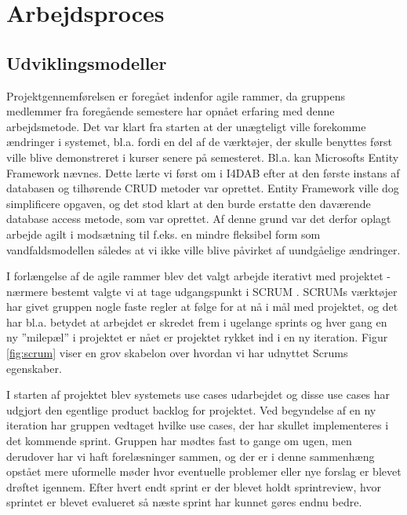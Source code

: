\section{Arbejdsproces}

\subsection{Udviklingsmodeller}
Projektgennemførelsen er foregået indenfor agile rammer, da gruppens medlemmer fra foregående semestere har opnået erfaring med denne arbejdsmetode. Det var klart fra starten at der unægteligt ville forekomme ændringer i systemet, bl.a. fordi en del af de værktøjer, der skulle benyttes først ville blive demonstreret i kurser senere på semesteret. Bl.a. kan Microsofts Entity Framework \citep{entityFrameworkWeb} nævnes. Dette lærte vi først om i I4DAB efter at den første instans af databasen og tilhørende CRUD metoder var oprettet. Entity Framework ville dog simplificere opgaven, og det stod klart at den burde erstatte den daværende database access metode, som var oprettet. Af denne grund var det derfor oplagt arbejde agilt i modsætning til f.eks. en mindre fleksibel form som vandfaldsmodellen således at vi ikke ville blive påvirket af uundgåelige ændringer.

I forlængelse af de agile rammer blev det valgt arbejde iterativt med projektet - nærmere bestemt valgte vi at tage udgangspunkt i SCRUM \citep{scrumWeb}. SCRUMs værktøjer har givet gruppen nogle faste regler at følge for at nå i mål med projektet, og det har bl.a. betydet at arbejdet er skredet frem i ugelange sprints og hver gang en ny ''milepæl'' i projektet er nået er projektet rykket ind i en ny iteration. Figur \ref{fig:scrum} viser en grov skabelon over hvordan vi har udnyttet Scrums egenskaber. 


I starten af projektet blev systemets use cases udarbejdet og disse use cases har udgjort den egentlige product backlog for projektet. Ved begyndelse af en ny iteration har gruppen vedtaget hvilke use cases, der har skullet implementeres i det kommende sprint. Gruppen har mødtes fast to gange om ugen, men derudover har vi haft forelæsninger sammen, og der er i denne sammenhæng opstået mere uformelle møder hvor eventuelle problemer eller nye forslag er blevet drøftet igennem. Efter hvert endt sprint er der blevet holdt sprintreview, hvor sprintet er blevet evalueret så næste sprint har kunnet gøres endnu bedre.   

